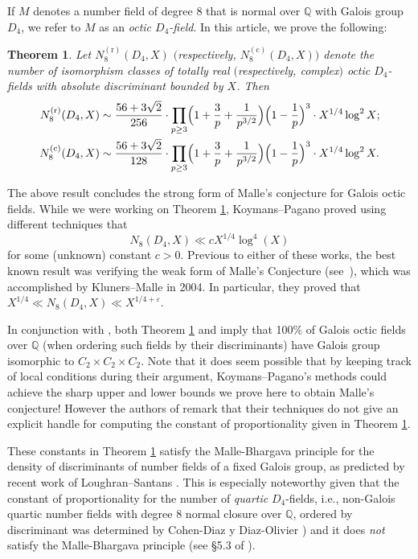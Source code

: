 \documentclass[10pt]{article}
\theoremstyle{plain}
\newtheorem{theorem}{Theorem}
\theoremstyle{definition}
\theoremstyle{remark}
\def\bQ{{\mathbb Q}}
\def\bQ{{\mathbb Q}}
\begin{document}
If $M$ denotes a number field of degree 8 that is normal over $\bQ$
with Galois group $D_4$, we refer to $M$ as an {\em octic
  $D_4$-field}. In this article, we prove the following:

\begin{theorem}\label{main}
Let $N_{8}^{(\mathrm{r})}(D_4,X)$ $($respectively,
$N_{8}^{(\mathrm{c})}(D_4,X))$ denote the number of isomorphism classes
of totally real $($respectively, complex$)$ octic $D_4$-fields with absolute
discriminant bounded by $X$. Then
\begin{align*} N_{8}^{(\mathrm{r})}(D_4,X) &\sim \frac{56+3\sqrt{2}}{256} \cdot \prod_{p\geq 3}\Bigl(1+\frac{3}{p}+\frac{1}{p^{3/2}}\Bigr)\Bigl(1-\frac{1}{p}\Bigr)^3
\cdot X^{1/4} \log^2 X;\\ 
N_{8}^{(\mathrm{c})}(D_4,X) &\sim 
\frac{56+3\sqrt{2}}{128}
\cdot\prod_{p\geq 3}\Bigl(1+\frac{3}{p}+\frac{1}{p^{3/2}}\Bigr)\Bigl(1-\frac{1}{p}\Bigr)^3 \cdot
X^{1/4} \log^2 X.
\end{align*}
\end{theorem}


The above result concludes the strong form of Malle's conjecture for
Galois octic fields.
While we were working on Theorem \ref{main}, Koymans--Pagano \cite{KP} proved using different techniques that $$N_8(D_4,X) \ll c X^{1/4} \log^4(X)$$
for some (unknown) constant $c > 0$. Previous to either of these works, the best known result was verifying the weak form of Malle's Conjecture (see~\cite{MR1884706}), which was accomplished by Kluners--Malle \cite{MR2076117} in 2004. In particular, they proved that 
	$X^{1/4} \ll N_8(D_4,X) \ll X^{1/4 +\varepsilon}.$  
 
 In conjunction
with \cite{MR969545,habilitation}, both Theorem \ref{main} and \cite{KP} imply that 100\% of Galois octic
fields over $\bQ$ (when ordering such fields by their discriminants)
have Galois group isomorphic to $C_2 \times C_2 \times C_2$. Note that it does seem possible that by keeping track of local conditions during their argument, Koymans--Pagano's methods could achieve the sharp upper and lower bounds we prove here to obtain Malle's conjecture! However the authors of \cite{KP} remark that their techniques do not give an explicit handle for computing the constant of proportionality given in Theorem \ref{main}. 


These constants in
Theorem \ref{main} satisfy the Malle-Bhargava principle for the
density of discriminants of number fields of a fixed Galois group, as predicted by recent work of Loughran--Santans \cite{LS}.
This is especially noteworthy given that the constant of proportionality for the
number of {\em quartic} $D_4$-fields, i.e., non-Galois quartic number fields
with degree 8 normal closure over $\bQ$, ordered by discriminant was determined by Cohen-Diaz y Diaz-Olivier \cite{MR1918290}) and it does
{\em not} satisfy the Malle-Bhargava principle (see \S5.3 of
\cite{D4preprint}).
\end{document}
